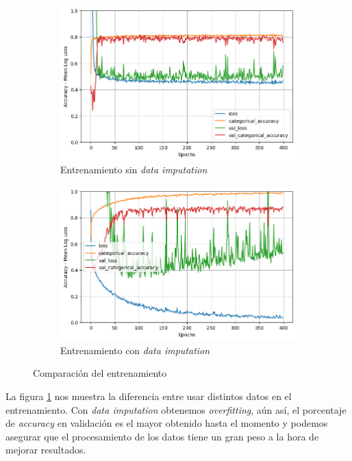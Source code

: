 \documentclass{article}
\begin{document}
			\begin{figure}[!h]
				\centering
     			\begin{subfigure}[b]{0.4\textwidth}
         			\centering
         			\includegraphics[scale=0.3]{d-tr-a3-e4}
         		\caption{Entrenamiento sin \textit{data imputation}}
         		\end{subfigure}
         		\hfill
     			\begin{subfigure}[b]{0.4\textwidth}
       				\centering
         			\includegraphics[scale=0.3]{d-tr-a3-e4-di}
         			\caption{Entrenamiento con \textit{data imputation}}
    		 	\end{subfigure}
    		 	\caption{Comparaci\'on del entrenamiento}
    		 	\label{d-s-tr-dp-2}
			\end{figure}
			La figura \ref{d-s-tr-dp-2} nos muestra la diferencia entre usar distintos datos en el entrenamiento. Con \textit{data imputation} obtenemos \textit{overfitting}, a\'un as\'i, el porcentaje de \textit{accuracy} en validaci\'on es el mayor obtenido hasta el momento y podemos asegurar que el procesamiento de los datos tiene un gran peso a la hora de mejorar resultados.
\end{document}
